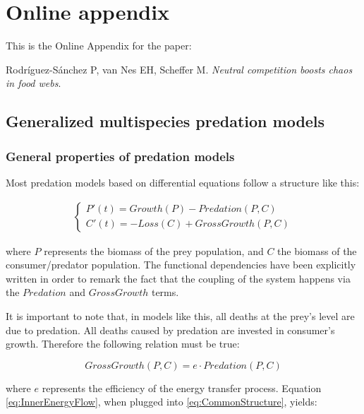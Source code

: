 \appendix
\section{Online appendix}
\label{sec:Appendix}

This is the Online Appendix for the paper:

\begin{center}
Rodríguez-Sánchez P, van Nes EH, Scheffer M. \textit{Neutral competition boosts chaos in food webs}.
\end{center}

\subsection{Generalized multispecies predation models}
\label{subsec:GeneralizedModels}

\subsubsection{General properties of predation models}
\label{subsubsec:GeneralPropertiesOfPredation}

Most predation models based on differential equations follow a structure like this:

\begin{eqnarray}
\label{eq:CommonStructure}
	\begin{cases}
	P'(t) = Growth(P) - Predation(P,C)
	\\
	C'(t) = -Loss(C) + GrossGrowth(P,C)
	\end{cases}
\end{eqnarray}

where $P$ represents the biomass of the prey population, and $C$ the biomass of the consumer/predator population. The functional dependencies have been explicitly written in order to remark the fact that the coupling of the system happens via the $Predation$ and $GrossGrowth$ terms.

It is important to note that, in models like this, all deaths at the prey's level are due to predation. All deaths caused by predation are invested in consumer's growth. Therefore the following relation must be true:

\begin{equation}
\label{eq:InnerEnergyFlow}
	GrossGrowth(P,C) = e \cdot Predation(P,C)
\end{equation}

where $e$ represents the efficiency of the energy transfer process. Equation \ref{eq:InnerEnergyFlow}, when plugged into \ref{eq:CommonStructure}, yields:

